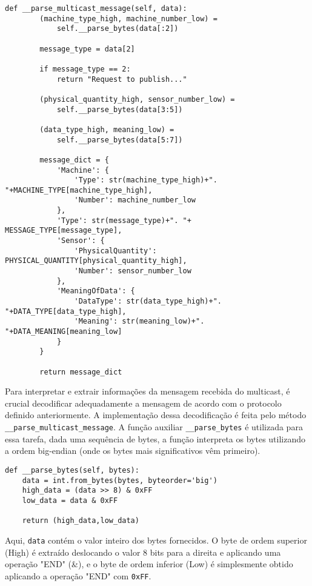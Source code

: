 \begin{verbatim}
def __parse_multicast_message(self, data):
        (machine_type_high, machine_number_low) = 
            self.__parse_bytes(data[:2])

        message_type = data[2]

        if message_type == 2:
            return "Request to publish..."

        (physical_quantity_high, sensor_number_low) = 
            self.__parse_bytes(data[3:5])
        
        (data_type_high, meaning_low) = 
            self.__parse_bytes(data[5:7])

        message_dict = {
            'Machine': {
                'Type': str(machine_type_high)+". "+MACHINE_TYPE[machine_type_high],
                'Number': machine_number_low
            },
            'Type': str(message_type)+". "+ MESSAGE_TYPE[message_type],
            'Sensor': {
                'PhysicalQuantity': PHYSICAL_QUANTITY[physical_quantity_high],
                'Number': sensor_number_low
            },
            'MeaningOfData': {
                'DataType': str(data_type_high)+". "+DATA_TYPE[data_type_high],
                'Meaning': str(meaning_low)+". "+DATA_MEANING[meaning_low]
            }
        }

        return message_dict
    \end{verbatim}



Para interpretar e extrair informações da mensagem recebida do multicast, é crucial decodificar adequadamente a mensagem de acordo com o protocolo definido anteriormente. A implementação dessa decodificação é feita pelo método \texttt{\_\_parse\_multicast\_message}. A função auxiliar \texttt{\_\_parse\_bytes} é utilizada para essa tarefa, dada uma sequência de bytes, a função interpreta os bytes utilizando a ordem big-endian (onde os bytes mais significativos vêm primeiro).

\begin{verbatim}
def __parse_bytes(self, bytes):
    data = int.from_bytes(bytes, byteorder='big')
    high_data = (data >> 8) & 0xFF
    low_data = data & 0xFF

    return (high_data,low_data)
\end{verbatim}

Aqui, \texttt{data} contém o valor inteiro dos bytes fornecidos. O byte de ordem superior (High) é extraído deslocando o valor 8 bits para a direita e aplicando uma operação "END" (\&), e o byte de ordem inferior (Low) é simplesmente obtido aplicando a operação "END" com \texttt{0xFF}.

